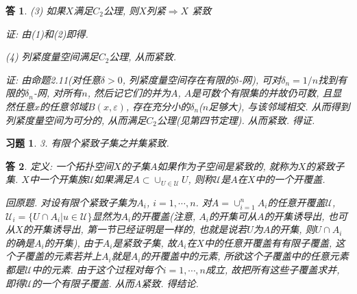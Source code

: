 \documentclass{ctexart}%
\newtheorem*{exercise}{习题}
\newtheorem*{solution}{答}
\theoremstyle{definition}
\theoremstyle{remark}
\begin{document}
\begin{solution}
\textsl{(3) 如果$X$满足$C_2$公理, 则$X$列紧$\Longrightarrow X$ 紧致}

证: 由(1)和(2)即得. 

\textsl{(4) 列紧度量空间满足$C_2$公理, 从而紧致. }

证: 由命题2.11(对任意$\delta>0$, 列紧度量空间存在有限的$\delta$-网), 可对$\delta_n=1/n$找到有限的$\delta_n$-网, 对所有$n$, 然后记它们的并为$A$, $A$是可数个有限集的并故仍可数, 且显然任意$x$的任意邻域$B(x,\varepsilon)$, 存在充分小的$\delta_n$($n$足够大), 与该邻域相交. 从而得到列紧度量空间为可分的, 从而满足$C_2$公理(见第四节定理). 从而紧致.  得证.
\end{solution}

\begin{exercise}3. 有限个紧致子集之并集紧致.
\end{exercise}
\begin{solution}
定义: 一个拓扑空间$X$的子集$A$如果作为子空间是紧致的, 就称为$X$的紧致子集. $X$中一个开集族$\mathscr{U}$如果满足$A\subset \cup_{U\in\mathscr{U}} U$, 则称$\mathscr{U}$是$A$在$X$中的一个开覆盖.

回原题. 对设有限个紧致子集为$A_i$, $i=1,\cdots, n$. 对$A=\cup_{i=1}^n A_i$的任意开覆盖$\mathscr{U}$, $\mathscr{U}_i=\{U\cap A_i| u\in \mathscr{U}\}$显然为$A_i$的开覆盖(注意, $A_i$的开集可从$A$的开集诱导出, 也可从$X$的开集诱导出, 第一节已经证明是一样的, 也就是说若$U$为$A$的开集, 则$U\cap A_i$的确是$A_i$的开集), 由于$A_i$是紧致子集, 故$A_i$在$X$中的任意开覆盖有有限子覆盖, 这个子覆盖的元素若并上$A_i$就是$A_i$的开覆盖中的元素, 所欲这个子覆盖中的任意元素都是$\mathscr{U}$中的元素. 由于这个过程对每个$i=1,\cdots, n$成立, 故把所有这些子覆盖求并, 即得$\mathscr{U}$的一个有限子覆盖. 从而$A$紧致. 得结论. 
\end{solution}
\end{document}
